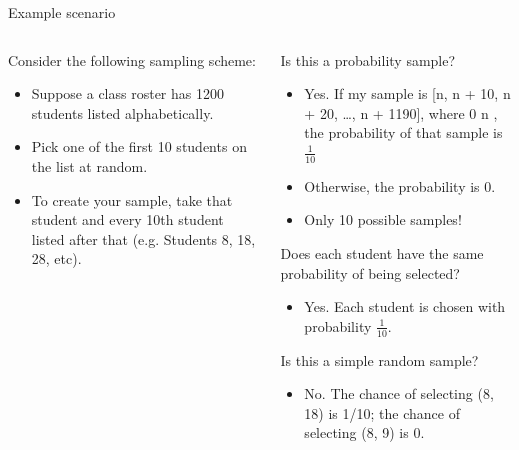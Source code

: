 \documentclass[aspectratio=169]{../latex_main/tntbeamer}  %
\begin{document}
	\begin{frame}{Example scenario}
	    \begin{columns}
	        \begin{column}{.3\textwidth}
	            Consider the following sampling scheme:

	            \begin{itemize}
	                \item Suppose a class roster has 1200 students listed alphabetically.
	                \item Pick one of the first 10 students on the list at random.
	                \item To create your sample, take that student and every 10th student listed after that (e.g. Students 8, 18, 28, etc).
	            \end{itemize}
                 
	        \end{column}
	        
	        \begin{column}{.6\textwidth}
	           Is this a probability sample?
	           \begin{itemize}
	               \item Yes. If my sample is [n, n + 10, n + 20, …, n + 1190], where 0 \leq n , the probability of that sample is $\frac{1}{10}$
	               \item Otherwise, the probability is 0.
	               \item Only 10 possible samples!
	           \end{itemize}
	           Does each student have the same probability of being selected?
	           \begin{itemize}
	               \item Yes. Each student is chosen with probability $\frac{1}{10}$. 
	           \end{itemize}
	           Is this a simple random sample?
                \begin{itemize}
                    \item No. The chance of selecting (8, 18) is 1/10; the chance of selecting (8, 9) is 0.
                \end{itemize}

	        \end{column}
	        
	    \end{columns}
	    
	\end{frame}
	
\end{document}
